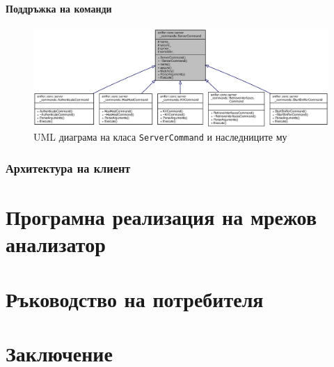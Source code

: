 \documentclass[12pt,a4paper,oneside]{book}
\begin{document}
\subsubsection{Поддръжка на команди}

\begin{figure}[h!]
  \centering
  \includegraphics[scale=.5]{figures/server_command_uml.eps}
  \caption{UML диаграма на класа \texttt{ServerCommand} и наследниците му}
  \label{server_command_uml_fig}
\end{figure}

\subsection{Архитектура на клиент}

\chapter{Програмна реализация на мрежов анализатор}

\chapter{Ръководство на потребителя}

\chapter{Заключение}
\end{document}
